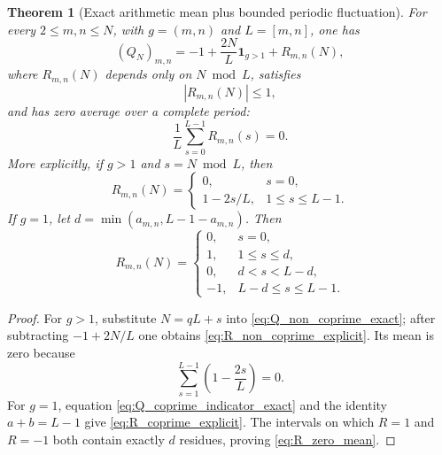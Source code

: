 \documentclass[11pt]{amsart}
\numberwithin{equation}{section}
\theoremstyle{plain}
\newtheorem{theorem}{Theorem}[section]
\theoremstyle{definition}
\theoremstyle{remark}
\begin{document}
\begin{theorem}[Exact arithmetic mean plus bounded periodic fluctuation]
\label{thm:Q_periodic_decomposition}
For every $2\le m,n\le N$, with $g=(m,n)$ and $L=[m,n]$, one has
\begin{equation}
(Q_N)_{m,n}
=-1+\frac{2N}{L}\mathbf 1_{g>1}+R_{m,n}(N),
\label{eq:Q_mean_periodic_decomposition}
\end{equation}
where $R_{m,n}(N)$ depends only on $N\bmod L$, satisfies
\begin{equation}
|R_{m,n}(N)|\le1,
\label{eq:R_uniform_bound}
\end{equation}
and has zero average over a complete period:
\begin{equation}
\frac1L\sum_{s=0}^{L-1}R_{m,n}(s)=0.
\label{eq:R_zero_mean}
\end{equation}
More explicitly, if $g>1$ and $s=N\bmod L$, then
\begin{equation}
R_{m,n}(N)=
\begin{cases}
0,&s=0,\\[1mm]
1-2s/L,&1\le s\le L-1.
\end{cases}
\label{eq:R_non_coprime_explicit}
\end{equation}
If $g=1$, let $d=\min(a_{m,n},L-1-a_{m,n})$.  Then
\begin{equation}
R_{m,n}(N)=
\begin{cases}
0,&s=0,\\
1,&1\le s\le d,\\
0,&d<s<L-d,\\
-1,&L-d\le s\le L-1.
\end{cases}
\label{eq:R_coprime_explicit}
\end{equation}
\end{theorem}

\begin{proof}
For $g>1$, substitute $N=qL+s$ into \eqref{eq:Q_non_coprime_exact}; after subtracting $-1+2N/L$ one obtains \eqref{eq:R_non_coprime_explicit}.  Its mean is zero because
\begin{equation}
\sum_{s=1}^{L-1}\left(1-\frac{2s}{L}\right)=0.
\end{equation}
For $g=1$, equation \eqref{eq:Q_coprime_indicator_exact} and the identity $a+b=L-1$ give \eqref{eq:R_coprime_explicit}.  The intervals on which $R=1$ and $R=-1$ both contain exactly $d$ residues, proving \eqref{eq:R_zero_mean}.
\end{proof}
\end{document}
